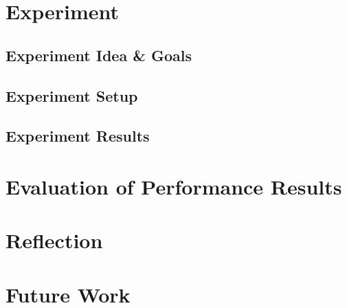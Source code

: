 \documentclass[	runningheads,
				a4paper]{llncs}
\begin{document}
\section{Experiment}
	\subsection{Experiment Idea \& Goals}
	\subsection{Experiment Setup}
	\subsection{Experiment Results}

\section{Evaluation of Performance Results}

\section{Reflection}

\section{Future Work}
	
	
	
	
\end{document}
